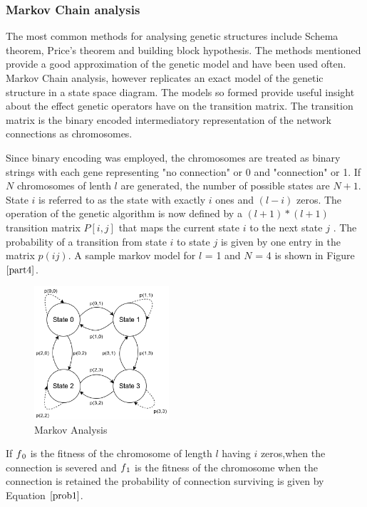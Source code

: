 \documentclass[conference]{IEEEtran}
\begin{document}
\subsubsection{Markov Chain analysis}

The most common methods for analysing genetic structures include Schema theorem, Price's theorem and building block hypothesis. The methods mentioned provide a good approximation of the genetic model and have been used often. Markov Chain analysis, however replicates an exact model of the genetic structure in a state space diagram. The models so formed provide useful insight about the effect genetic operators have on the transition matrix. The transition matrix is the binary encoded intermediatory representation of the network connections as chromosomes. 

Since binary encoding was employed, the chromosomes are treated as binary strings with each gene representing "no connection" or 0 and "connection" or 1. If $N$ chromosomes of lenth $l$ are generated, the number of possible states are $N+1$. State $i$ is referred to as the state with exactly $i$ ones and $(l - i)$ zeros. The operation of the genetic algorithm is now defined by a $(l + 1)*(l + 1)$ transition matrix $P[i, j]$ that maps the current state $i$ to the next state $j$ . The probability of a transition from state $i$ to state $j$ is given by one
entry in the matrix $p(ij)$. A sample markov model for $l$ = 1 and $N$ = 4 is shown in Figure $\ref{part4}$.

\begin{figure}[!b]
\centerline{\includegraphics[width=50mm]{part4.png}}
\caption{Markov Analysis}
\label{part4}
\end{figure}

If $f\textsubscript{0}$ is the fitness of the chromosome of length $l$ having $i$ zeros,when the connection is severed and $f\textsubscript{1}$ is the fitness of the chromosome when the connection is retained the probability of connection surviving is given by Equation $\ref{prob1}$.
\end{document}
